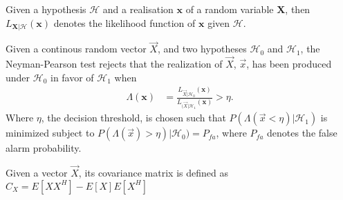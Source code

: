 \documentclass[a4paper, openany, oneside]{memoir}
\begin{document}
\begin{blockDefinition}
Given a hypothesis $\mathcal{H}$ and a realisation $\mathbf{x}$ of a random variable $\mathbf{X}$, then $L_{\mathbf{X} | \mathcal{H}}(\mathbf{x})$ denotes the likelihood function of $\mathbf{x}$ given $\mathcal{H}$.
\end{blockDefinition}

\begin{blockDefinition}
Given a continous random vector $\vec{X}$, and two hypotheses $\mathcal{H}_0$ and $\mathcal{H}_1$, the Neyman-Pearson test rejects that the realization of $\vec{X}$, $\vec{x}$, has been produced under $\mathcal{H}_0$ in favor of $\mathcal{H}_1$
when
\begin{align*}
    \Lambda (\mathbf{x}) &= \frac{L_{\vec{X} | \mathcal{H}_0} (\mathbf{x})}{L_{(\vec{X} | \mathcal{H}_1}(\mathbf{x})} > \eta. 
\end{align*}
Where $\eta$, the decision threshold, is chosen such that $P(\Lambda(\vec{x} < \eta) | \mathcal{H}_1)$ is minimized subject to $P(\Lambda(\vec{x}) > \eta) | \mathcal{H}_0) = P_{fa}$, where $P_{fa}$ denotes the false alarm probability. %
\end{blockDefinition}

\begin{blockDefinition}
Given a vector $\vec{X}$, its covariance matrix is defined as $C_{X} = E\left[XX^H\right]-E\left[X\right]E\left[X^H\right]$
\end{blockDefinition}
\end{document}
